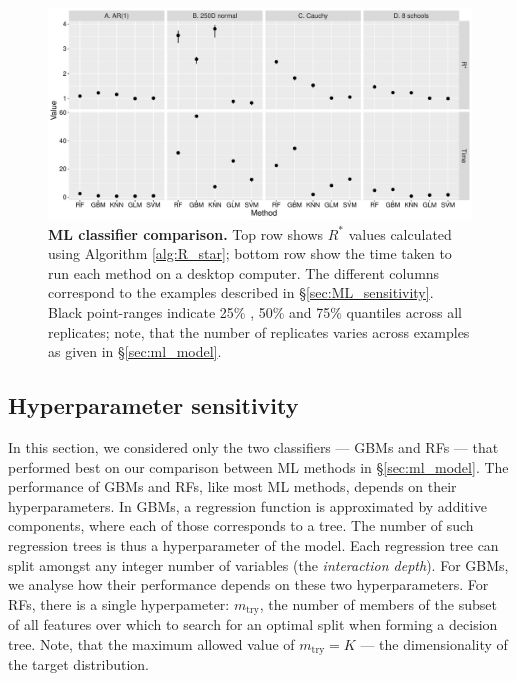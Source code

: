 \documentclass[ba]{imsart}
\numberwithin{equation}{section}
\theoremstyle{plain}
\begin{document}
\begin{supplement}
		
		\begin{figure}[!htb]
			\centerline{\includegraphics[width=1.0\textwidth]{ml_comparison_all.pdf}}
			\caption{\textbf{ML classifier comparison.} Top row shows $R^*$ values calculated using Algorithm \ref{alg:R_star}; bottom row show the time taken to run each method on a desktop computer. The different columns correspond to the examples described in \S\ref{sec:ML_sensitivity}. Black point-ranges indicate 25\% , 50\% and 75\% quantiles across all replicates; note, that the number of replicates varies across examples as given in \S\ref{sec:ml_model}.}
			\label{fig:ml_comparison_all}
		\end{figure}
		
		\subsection{Hyperparameter sensitivity}\label{sec:hyperparameters}
		In this section, we considered only the two classifiers — GBMs and RFs — that performed best on our comparison between ML methods in \S\ref{sec:ml_model}. The performance of GBMs and RFs, like most ML methods, depends on their hyperparameters. In GBMs, a regression function is approximated by additive components, where each of those corresponds to a tree. The number of such regression trees is thus a hyperparameter of the model. Each regression tree can split amongst any integer number of variables (the \textit{interaction depth}). For GBMs, we analyse how their performance depends on these two hyperparameters. For RFs, there is a single hyperpameter: $m_{\text{try}}$, the number of members of the subset of all features over which to search for an optimal split when forming a decision tree. Note, that the maximum allowed value of $m_{\text{try}}=K$ — the dimensionality of the target distribution. 
		

\end{supplement}
\end{document}
